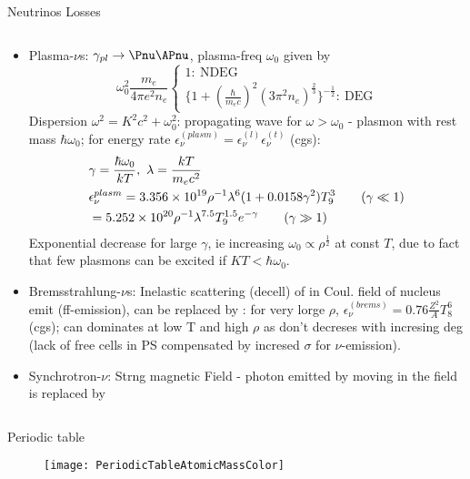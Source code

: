 \begin{frame}{Neutrinos Losses}
\begin{columns}[T]
\begin{column}{0.52\textwidth}
    \begin{itemize}
                    \item Plasma-$\nu$s: $\gamma_{pl}\to\Pnu\APnu$, plasma-freq $\omega_0$ given by
                        \[\omega_0^2 \frac{m_e}{4\pi e^2n_e}\left\{
                            \begin{array}{l}
                                1:\ \text{NDEG}\\
                                \{1+(\frac{\hbar}{m_ec})^2(3\pi^2n_e)^{\frac{2}{3}}\}^{-\frac{1}{2}}:\ \text{DEG}
                        \end{array}
                \right.\]
                Dispersion $\omega^2=K^2c^2+\omega_0^2$: propagating wave for $\omega>\omega_0$ - plasmon with rest mass $\hbar\omega_0$; for energy rate $\epsilon_{\nu}^{(plasm)}=\epsilon_{\nu}^{(l)}\epsilon_{\nu}^{(t)}$ (cgs):
                \begin{align*}
                    &\gamma=\frac{\hbar\omega_0}{kT},\ \lambda=\frac{kT}{m_ec^2}\\
                    &\epsilon_{\nu}^{plasm}=\num{3.356e19}\invers{\rho}\lambda^6(1+0.0158\gamma^2)T_9^3\tag{$\gamma\ll1$}\\
                    &=\num{5.252e20}\invers{\rho}\lambda^{7.5}T_9^{1.5}\exp{-\gamma}\tag{$\gamma\gg1$}
                \end{align*}
                        Exponential decrease for large $\gamma$, ie increasing $\omega_0\propto\rho^{\frac{1}{2}}$ at const $T$, due to fact that few plasmons can be excited if $KT<\hbar\omega_0$.
                    \item Bremsstrahlung-$\nu$s: Inelastic scattering (decell) of \Pelectron in Coul. field of nucleus emit \Pgamma (ff-emission), \Pgamma can be replaced by \Pnu\APnu: for very lorge $\rho$, $\epsilon_{\nu}^{(brems)}=\num{0.76}\frac{Z^2}{A}T_8^6$ (cgs); can dominates at low T and high $\rho$ as don't decreses with incresing deg (lack of free cells in PS compensated by incresed $\sigma$ for $\nu$-emission).
                    \item Synchrotron-$\nu$: Strng magnetic Field - photon emitted by \Pelectron moving in the field is replaced by \Pnu\APnu
        \end{itemize}
        \end{column}
    \end{columns}
\end{frame}

\begin{frame}{Periodic table}
    
\begin{figure}[!ht]
    \texttt{[image: PeriodicTableAtomicMassColor]}\label{fig:PeriodicTableAtomicMassColor}
\end{figure}
\end{frame}

